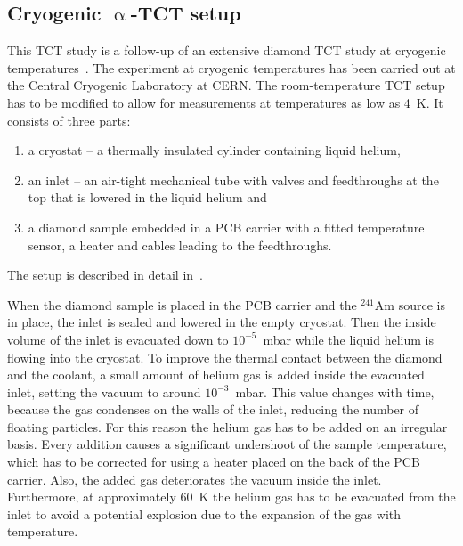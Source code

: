 \subsection{Cryogenic $\upalpha$-TCT setup}
\label{sec:cryosetup}
This TCT study is a follow-up of an extensive diamond TCT study at cryogenic temperatures~\cite{Jansen:1956431}. The experiment at cryogenic temperatures has been carried out at the Central Cryogenic Laboratory at CERN. The room-temperature TCT setup has to be modified to allow for measurements at temperatures as low as 4~K. It consists of three parts: 
\begin{enumerate}
\item a cryostat --  a thermally insulated cylinder containing liquid helium,
\item an inlet -- an air-tight mechanical tube with valves and feedthroughs at the top that is lowered in the liquid helium and
\item a diamond sample embedded in a PCB carrier with a fitted temperature sensor, a heater and cables leading to the feedthroughs.
\end{enumerate}
The setup is described in detail in~\cite{Jansen:1956431}.

When the diamond sample is placed in the PCB carrier and the $^{241}$Am source is in place, the inlet is sealed and lowered in the empty cryostat. Then the inside volume of the inlet is evacuated down to $10^{-5}$~mbar while the liquid helium is flowing into the cryostat. To improve the thermal contact between the diamond and the coolant, a small amount of helium gas is added inside the evacuated inlet, setting the vacuum to around $10^{-3}$~mbar. This value changes with time, because the gas condenses on the walls of the inlet, reducing the number of floating particles. For this reason the helium gas has to be added on an irregular basis. Every addition causes a significant undershoot of the sample temperature, which has to be corrected for using a heater placed on the back of the PCB carrier. Also, the added gas deteriorates the vacuum inside the inlet. 
Furthermore, at approximately 60~K the helium gas has to be evacuated from the inlet to avoid a potential explosion due to the expansion of the gas with temperature. 

